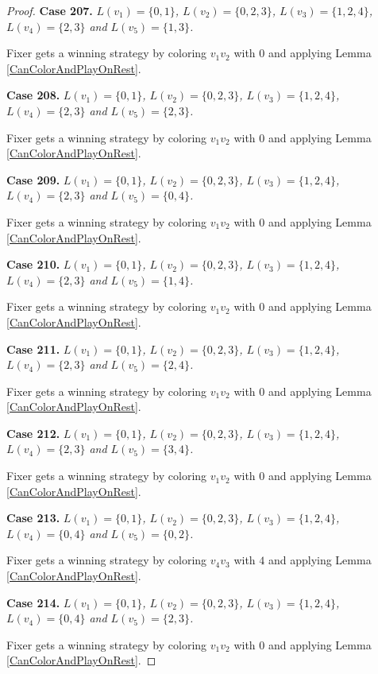\documentclass[12pt]{amsart}
\theoremstyle{plain}
\theoremstyle{definition}
\theoremstyle{remark}
\begin{document}
\begin{proof}
\noindent\textbf{Case 207.  }\textit{$L(v_1) = \{0, 1\}$, $L(v_2) = \{0, 2, 3\}$, $L(v_3) = \{1, 2, 4\}$, $L(v_4) = \{2, 3\}$ and $L(v_5) = \{1, 3\}$.}

Fixer gets a winning strategy by coloring $v_1v_2$ with $0$ and applying Lemma \ref{CanColorAndPlayOnRest}.

\noindent\textbf{Case 208.  }\textit{$L(v_1) = \{0, 1\}$, $L(v_2) = \{0, 2, 3\}$, $L(v_3) = \{1, 2, 4\}$, $L(v_4) = \{2, 3\}$ and $L(v_5) = \{2, 3\}$.}

Fixer gets a winning strategy by coloring $v_1v_2$ with $0$ and applying Lemma \ref{CanColorAndPlayOnRest}.

\noindent\textbf{Case 209.  }\textit{$L(v_1) = \{0, 1\}$, $L(v_2) = \{0, 2, 3\}$, $L(v_3) = \{1, 2, 4\}$, $L(v_4) = \{2, 3\}$ and $L(v_5) = \{0, 4\}$.}

Fixer gets a winning strategy by coloring $v_1v_2$ with $0$ and applying Lemma \ref{CanColorAndPlayOnRest}.

\noindent\textbf{Case 210.  }\textit{$L(v_1) = \{0, 1\}$, $L(v_2) = \{0, 2, 3\}$, $L(v_3) = \{1, 2, 4\}$, $L(v_4) = \{2, 3\}$ and $L(v_5) = \{1, 4\}$.}

Fixer gets a winning strategy by coloring $v_1v_2$ with $0$ and applying Lemma \ref{CanColorAndPlayOnRest}.

\noindent\textbf{Case 211.  }\textit{$L(v_1) = \{0, 1\}$, $L(v_2) = \{0, 2, 3\}$, $L(v_3) = \{1, 2, 4\}$, $L(v_4) = \{2, 3\}$ and $L(v_5) = \{2, 4\}$.}

Fixer gets a winning strategy by coloring $v_1v_2$ with $0$ and applying Lemma \ref{CanColorAndPlayOnRest}.

\noindent\textbf{Case 212.  }\textit{$L(v_1) = \{0, 1\}$, $L(v_2) = \{0, 2, 3\}$, $L(v_3) = \{1, 2, 4\}$, $L(v_4) = \{2, 3\}$ and $L(v_5) = \{3, 4\}$.}

Fixer gets a winning strategy by coloring $v_1v_2$ with $0$ and applying Lemma \ref{CanColorAndPlayOnRest}.

\noindent\textbf{Case 213.  }\textit{$L(v_1) = \{0, 1\}$, $L(v_2) = \{0, 2, 3\}$, $L(v_3) = \{1, 2, 4\}$, $L(v_4) = \{0, 4\}$ and $L(v_5) = \{0, 2\}$.}

Fixer gets a winning strategy by coloring $v_4v_3$ with $4$ and applying Lemma \ref{CanColorAndPlayOnRest}.

\noindent\textbf{Case 214.  }\textit{$L(v_1) = \{0, 1\}$, $L(v_2) = \{0, 2, 3\}$, $L(v_3) = \{1, 2, 4\}$, $L(v_4) = \{0, 4\}$ and $L(v_5) = \{2, 3\}$.}

Fixer gets a winning strategy by coloring $v_1v_2$ with $0$ and applying Lemma \ref{CanColorAndPlayOnRest}.


\end{proof}
\end{document}
